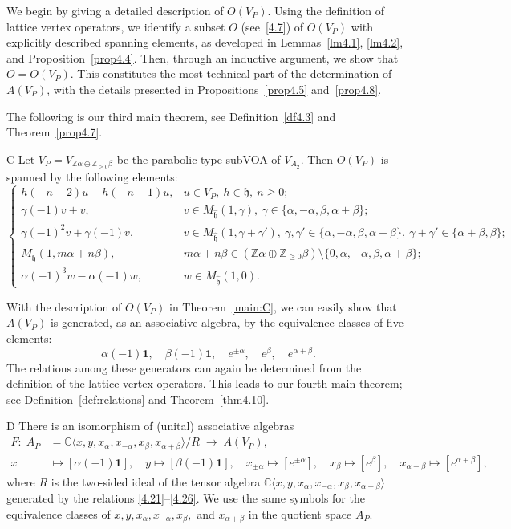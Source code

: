\documentclass[12pt,a4paper,reqno]{amsart}
\numberwithin{equation}{section}
\numberwithin{equation}{section}
\theoremstyle{definition}
\newcommand{\Z}{\mathbb{Z}}
\def \C {\mathbb{C}}
\def \al{\alpha}
\def \ga {\gamma}
\def \b {\beta}
\def \op {\oplus}
\def \vac {\mathbf{1}}
\def \h {\mathfrak{h}}
\def\<{\langle}
\def\>{\rangle}
\begin{document}
We begin by giving a detailed description of $O(V_P)$. Using the definition of lattice vertex operators, we identify a subset $O$ (see~\eqref{4.7}) of $O(V_P)$ with explicitly described spanning elements, as developed in Lemmas~\ref{lm4.1}, \ref{lm4.2}, and Proposition~\ref{prop4.4}. Then, through an inductive argument, we show that $O=O(V_P)$. This constitutes the most technical part of the determination of $A(V_P)$, with the details presented in Propositions~\ref{prop4.5} and~\ref{prop4.8}. 

The following is our third main theorem, see Definition~\ref{df4.3} and Theorem~\ref{prop4.7}.

\begin{customthm}{C}\label{main:C}
	Let $V_P=V_{\Z\al\op \Z_{\geq 0} \b}$ be the parabolic-type subVOA of $V_{A_2}$. Then $O(V_P)$ is spanned by the following elements:
	\[
	\begin{cases}
		h(-n-2)u+h(-n-1)u, & u\in V_P,\ h\in \h,\ n\geq 0;\\
		\ga(-1)v+v, & v\in M_{\hat{\h}}(1,\ga),\ \ga\in \{ \al,-\al,\b,\al+\b\};\\
		\ga(-1)^2v+\ga(-1)v, & v\in M_{\hat{\h}}(1,\ga+\ga'),\ \ga,\ga'\in \{\al,-\al,\b,\al+\b\},\ \ga+\ga'\in \{\al+\b,\b\};\\
		M_{\hat{\h}}(1,m\al+n\b), & m\al+n\b \in (\Z\al\op \Z_{\geq 0}\b)\setminus\{0,\al,-\al,\b,\al+\b\};\\
		\al(-1)^3w-\al(-1)w, & w\in M_{\hat{\h}}(1,0).
	\end{cases}
	\]
\end{customthm}
With the description of $O(V_P)$ in Theorem~\ref{main:C}, we can easily show that $A(V_P)$ is generated, as an associative algebra, by the equivalence classes of five elements:
\[
\al(-1)\vac,\quad \b(-1)\vac,\quad e^{\pm \al},\quad e^\b,\quad e^{\al+\b}.
\]
The relations among these generators can again be determined from the definition of the lattice vertex operators. This leads to our fourth main theorem; see Definition~\ref{def:relations} and Theorem~\ref{thm4.10}.

\begin{customthm}{D}\label{main:D}
	There is an isomorphism of (unital) associative algebras
	\begin{equation}\label{eq:structure}
		\begin{aligned}
			F:\; A_P
			&=\C\<x,y,x_\al,x_{-\al},x_\b,x_{\al+\b}\>/R
			\;\longrightarrow\; A(V_P),\\
			x &\mapsto [\al(-1)\vac],\quad 
			y \mapsto [\b(-1)\vac],\quad 
			x_{\pm \al} \mapsto [e^{\pm \al}],\quad 
			x_\b \mapsto [e^\b],\quad 
			x_{\al+\b} \mapsto [e^{\al+\b}],
		\end{aligned}
	\end{equation}
	where $R$ is the two-sided ideal of the tensor algebra $\C\<x,y,x_\al,x_{-\al},x_\b,x_{\al+\b}\>$ generated by the relations \eqref{4.21}--\eqref{4.26}. We use the same symbols for the equivalence classes of $x,y,x_\al,x_{-\al},x_\b,$ and $x_{\al+\b}$ in the quotient space $A_P$.
\end{customthm}
\end{document}

